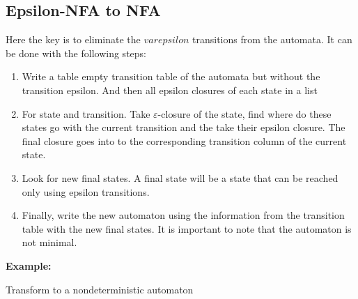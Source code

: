 \subsection{Epsilon-NFA to NFA}

Here the key is to eliminate the \(varepsilon\) transitions from the automata. It can be done 
with the following steps:

\begin{enumerate}
     
    \item Write a table empty transition table of the automata but without the transition epsilon. And then 
          all epsilon closures of each state in a list
   
    \item For state and transition. Take \(\varepsilon\)-closure of the state, find where do
          these states go with the current transition and the take their epsilon closure. The final closure
          goes into to the corresponding transition column of the current state.
    
    \item Look for new final states. A final state will be a state that can be reached only using epsilon 
          transitions.
    
    \item Finally, write the new automaton using the information from the transition table with the new 
          final states. It is important to note that the automaton is not minimal. 

\end{enumerate}

\textbf{Example:}

Transform to a nondeterministic automaton 

\begin{center}
\end{center}

